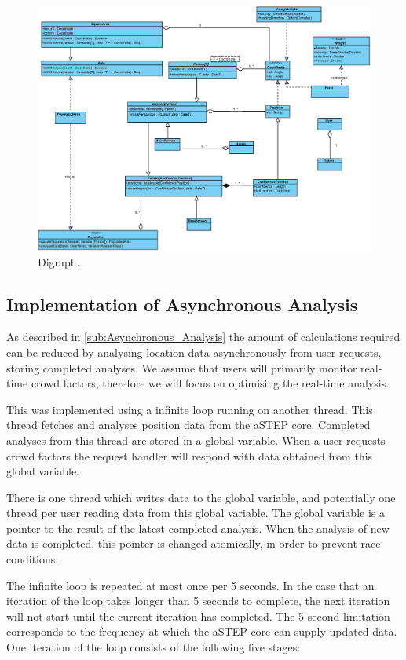 \begin{figure}
\centering
\includegraphics[width=\linewidth]{figures/class.eps}
\caption{Digraph.}
\label{fig:class}
\end{figure}


\subsection{Implementation of Asynchronous Analysis}
\label{sub:implementation_of_asynchronous_analysis}

As described in \cref{sub:Asynchronous_Analysis} the amount of calculations required can be reduced by analysing location data asynchronously from user requests, storing completed analyses. We assume that users will primarily monitor real-time crowd factors, therefore we will focus on optimising the real-time analysis.

This was implemented using a infinite loop running on another thread. This thread fetches and analyses position data from the aSTEP core. Completed analyses from this thread are stored in a global variable. When a user requests crowd factors the request handler will respond with data obtained from this global variable. 

There is one thread which writes data to the global variable, and potentially one thread per user reading data from this global variable. The global variable is a pointer to the result of the latest completed analysis. When the analysis of new data is completed, this pointer is changed atomically, in order to prevent race conditions. 

The infinite loop is repeated at most once per 5 seconds. In the case that an iteration of the loop takes longer than 5 seconds to complete, the next iteration will not start until the current iteration has completed. The 5 second limitation corresponds to the frequency at which the aSTEP core can supply updated data. One iteration of the loop consists of the following five stages: 

